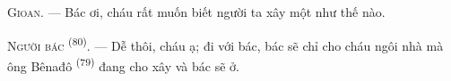 %
%
%
%
%
%

\VUsaut{6.0mm}
\VUsaut{1.4mm}
\VUsaut{2.2mm}

\VUsaut{3.0mm}

\textsc{Gioan}. --- Bác ơi, cháu rất muốn biết người ta xây một  như
thế nào.

\textsc{Người bác} \textsuperscript{(80)}. --- Dễ thôi, cháu ạ; đi với bác, bác sẽ chỉ
cho cháu ngôi nhà mà ông Bênađô \textsuperscript{(79)} đang cho xây và bác sẽ ở.

